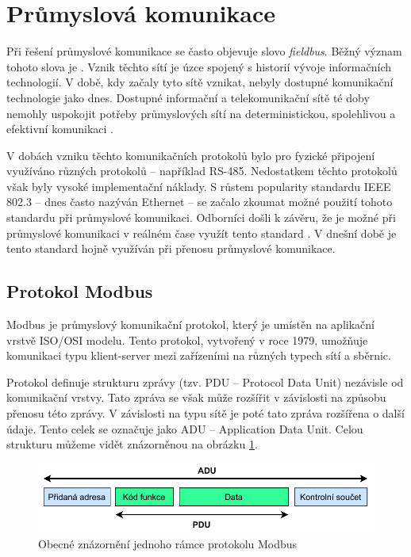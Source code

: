 \section{Průmyslová komunikace}\label{sec:fieldbus}

Při řešení průmyslové komunikace se často objevuje slovo \textit{fieldbus}. Běžný význam tohoto slova je  \cite{fieldbus_thomesse}. Vznik těchto sítí je úzce spojený s historií vývoje informačních technologií. V době, kdy začaly tyto sítě vznikat, nebyly dostupné komunikační technologie jako dnes. Dostupné informační a telekomunikační sítě té doby nemohly uspokojit potřeby průmyslových sítí na deterministickou, spolehlivou a efektivní komunikaci \cite{future_of_ind_com}. 

V dobách vzniku těchto komunikačních protokolů bylo pro fyzické připojení využíváno různých protokolů -- například RS-485. Nedostatkem těchto protokolů však byly vysoké implementační náklady. S růstem popularity standardu IEEE 802.3 -- dnes často nazýván Ethernet -- se začalo zkoumat možné použití tohoto standardu při průmyslové komunikaci. Odborníci došli k závěru, že je možné při průmyslové komunikaci v reálném čase využít tento standard \cite{lee_ethernet_fieldbus}. V dnešní době je tento standard hojně využíván při přenosu průmyslové komunikace.


\subsection{Protokol Modbus}
Modbus je průmyslový komunikační protokol, který je umístěn na aplikační vrstvě ISO/OSI modelu. Tento protokol, vytvořený v roce 1979, umožňuje komunikaci typu klient-server mezi zařízeními na různých typech sítí a sběrnic. 

Protokol definuje strukturu zprávy (tzv. PDU -- Protocol Data Unit) nezávisle od komunikační vrstvy. Tato zpráva se však může rozšířit v závislosti na způsobu přenosu této zprávy. V závislosti na typu sítě je poté tato zpráva rozšířena o další údaje. Tento celek se označuje jako ADU -- Application Data Unit. Celou strukturu můžeme vidět znázorněnou na obrázku \ref{fig:modbus_frame}.~\cite{modbus}

\begin{figure}[htbp]
    \centering 
    \includegraphics[width=\textwidth]{assets/img/modbusframe.pdf}
    \caption{Obecné znázornění jednoho rámce protokolu Modbus}
    \label{fig:modbus_frame}
\end{figure}

